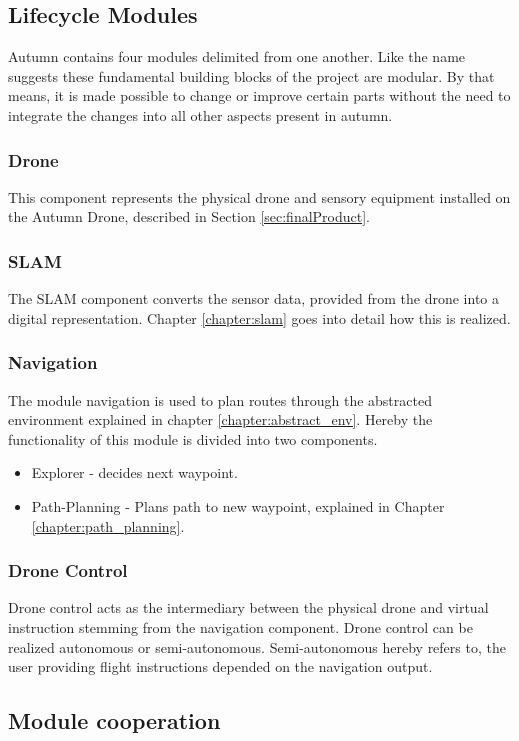 \subsection{Lifecycle Modules}

Autumn contains four modules delimited from one another. Like the name suggests these fundamental building blocks of the project are modular. By that means, it is made possible to change or improve certain parts without the need to integrate the changes into all other aspects present in autumn.

\subsubsection{Drone} This component represents the physical drone and sensory equipment installed on the Autumn Drone, described in Section \ref{sec:finalProduct}.  
\subsubsection{SLAM} The SLAM component converts the sensor data, provided from the drone into a digital representation. Chapter \ref{chapter:slam} goes into detail how this is realized.
\subsubsection{Navigation} The module navigation is used to plan routes through the abstracted environment explained in chapter \ref{chapter:abstract_env}. Hereby the functionality of this module is divided into two components.
	\begin{itemize}
		\item Explorer - decides next waypoint.
		\item Path-Planning - Plans path to new waypoint, explained in Chapter \ref{chapter:path_planning}.
	\end{itemize}
\subsubsection{Drone Control}
Drone control acts as the intermediary between the physical drone and virtual instruction stemming from the navigation component. Drone control can be realized autonomous or semi-autonomous. Semi-autonomous hereby refers to, the user providing flight instructions depended on the navigation output.

\subsection{Module cooperation}

